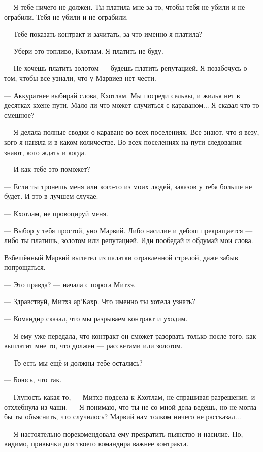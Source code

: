 --- Я тебе ничего не должен.
Ты платила мне за то, чтобы тебя не убили и не ограбили.
Тебя не убили и не ограбили.

--- Тебе показать контракт и зачитать, за что именно я платила?

--- Убери это топливо, Кхотлам.
Я платить не буду.

--- Не хочешь платить золотом --- будешь платить репутацией.
Я позабочусь о том, чтобы все узнали, что у Марвиев нет чести.

--- Аккуратнее выбирай слова, Кхотлам.
Мы посреди сельвы, и жилья нет в десятках кхене пути.
Мало ли что может случиться с караваном...
Я сказал что-то смешное?

--- Я делала полные сводки о караване во всех поселениях.
Все знают, что я везу, кого я наняла и в каком количестве.
Во всех поселениях на пути следования знают, кого ждать и когда.

--- И как тебе это поможет?

--- Если ты тронешь меня или кого-то из моих людей, заказов у тебя больше не будет.
И это в лучшем случае.

--- Кхотлам, не провоцируй меня.

--- Выбор у тебя простой, уно Марвий.
Либо насилие и дебош прекращается --- либо ты платишь, золотом или репутацией.
Иди пообедай и обдумай мои слова.

Взбешённый Марвий вылетел из палатки отравленной стрелой, даже забыв попрощаться.

\asterism

--- Это правда? --- начала с порога Митхэ.

--- Здравствуй, Митхэ ар'Кахр.
Что именно ты хотела узнать?

--- Командир сказал, что мы разрываем контракт и уходим.

--- Я ему уже передала, что контракт он сможет разорвать только после того, как выплатит мне то, что должен --- рассветами или золотом.

--- То есть мы ещё и должны тебе остались?

--- Боюсь, что так.

--- Глупость какая-то, --- Митхэ подсела к Кхотлам, не спрашивая разрешения, и отхлебнула из чаши.
--- Я понимаю, что ты не со мной дела ведёшь, но не могла бы ты объяснить, что случилось?
Марвий нам толком ничего не рассказал...

--- Я настоятельно порекомендовала ему прекратить пьянство и насилие.
Но, видимо, привычки для твоего командира важнее контракта.

